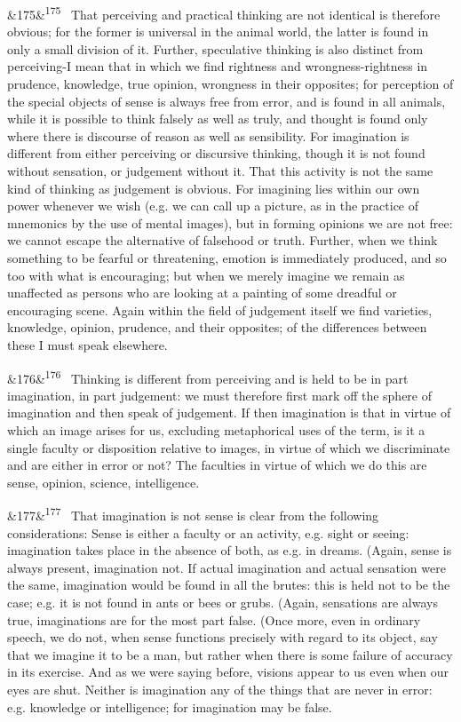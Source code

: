 \documentclass[12pt]{article}
\newcommand{\para}[1][]{\par\noindent\ifx&#1&\else\textsuperscript{\footnotesize #1}~\fi}
\begin{document}
\para[175] That perceiving and practical thinking are not identical is therefore obvious; for the former is universal in the animal world, the latter is found in only a small division of it. Further, speculative thinking is also distinct from perceiving-I mean that in which we find rightness and wrongness-rightness in prudence, knowledge, true opinion, wrongness in their opposites; for perception of the special objects of sense is always free from error, and is found in all animals, while it is possible to think falsely as well as truly, and thought is found only where there is discourse of reason as well as sensibility. For imagination is different from either perceiving or discursive thinking, though it is not found without sensation, or judgement without it. That this activity is not the same kind of thinking as judgement is obvious. For imagining lies within our own power whenever we wish (e.g. we can call up a picture, as in the practice of mnemonics by the use of mental images), but in forming opinions we are not free: we cannot escape the alternative of falsehood or truth. Further, when we think something to be fearful or threatening, emotion is immediately produced, and so too with what is encouraging; but when we merely imagine we remain as unaffected as persons who are looking at a painting of some dreadful or encouraging scene. Again within the field of judgement itself we find varieties, knowledge, opinion, prudence, and their opposites; of the differences between these I must speak elsewhere.

\para[176] Thinking is different from perceiving and is held to be in part imagination, in part judgement: we must therefore first mark off the sphere of imagination and then speak of judgement. If then imagination is that in virtue of which an image arises for us, excluding metaphorical uses of the term, is it a single faculty or disposition relative to images, in virtue of which we discriminate and are either in error or not? The faculties in virtue of which we do this are sense, opinion, science, intelligence.

\para[177] That imagination is not sense is clear from the following considerations: Sense is either a faculty or an activity, e.g. sight or seeing: imagination takes place in the absence of both, as e.g. in dreams. (Again, sense is always present, imagination not. If actual imagination and actual sensation were the same, imagination would be found in all the brutes: this is held not to be the case; e.g. it is not found in ants or bees or grubs. (Again, sensations are always true, imaginations are for the most part false. (Once more, even in ordinary speech, we do not, when sense functions precisely with regard to its object, say that we imagine it to be a man, but rather when there is some failure of accuracy in its exercise. And as we were saying before, visions appear to us even when our eyes are shut. Neither is imagination any of the things that are never in error: e.g. knowledge or intelligence; for imagination may be false.
\end{document}
